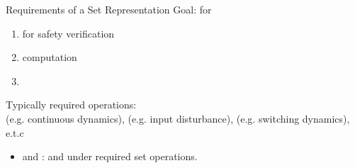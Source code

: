 \begin{frame}{Requirements of a Set Representation}
%
Goal:  for
%
\begin{enumerate}
\item {} for safety verification
\item {} computation
\item {}
\end{enumerate}
%
\vspace{2em}
Typically required operations:\\
 (e.g. continuous dynamics),  (e.g. input disturbance),  (e.g. switching dynamics), e.t.c
%
\vspace{2em}
\begin{itemize}
\item {} and : 
  and  under required set operations.
\vspace{1em}

\end{itemize}
\end{frame}




